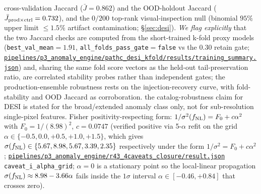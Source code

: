 \documentclass[aps,prd,twocolumn,superscriptaddress,showpacs,preprintnumbers,nofootinbib,longbibliography,floatfix]{revtex4-2}
\newcommand{\repoBase}{https://github.com/Hubify-Projects/bigbounce/blob/main}
\newcommand{\artifact}[1]{\href{\repoBase/#1}{\nolinkurl{#1}}}
\newcommand{\sigfnl}{\sigma(f_{\rm NL})}
\begin{document}
cross-validation Jaccard ($\bar J = 0.862$) and the OOD-holdout Jaccard ($\bar J_{\rm prod\times ctrl} = 0.732$), and the $0/200$ top-rank visual-inspection null (binomial $95\%$ upper limit $\leq 1.5\%$ artifact contamination; \S\ref{sec:desi}). \emph{We flag explicitly} that the two Jaccard checks are computed from the short-trained k-fold proxy models (\texttt{best\_val\_mean}$=1.91$, \texttt{all\_folds\_pass\_gate}$=$\texttt{false} vs the $0.30$ retain gate; \artifact{pipelines/p3\_anomaly\_engine/pathc\_desi\_kfold/results/training\_summary.json}) and, sharing the same fold score vectors as the held-out tail-preservation ratio, are correlated stability probes rather than independent gates; the production-ensemble robustness rests on the injection-recovery curve, with fold-stability and OOD Jaccard as corroboration. the catalog-robustness claim for DESI is stated for the broad/extended anomaly class only, not for sub-resolution single-pixel features. Fisher positivity-respecting form: $1/\sigma^2(f_{\rm NL}) = F_0 + c\alpha^2$ with $F_0 = 1/(8.98)^2$, $c = 0.0747$ (verified positive via 5-$\alpha$ refit on the grid $\alpha \in \{-0.5, 0.0, +0.5, +1.0, +1.5\}$, which gives $\sigma(f_{\rm NL}) \in \{5.67, 8.98, 5.67, 3.39, 2.35\}$ respectively under the form $1/\sigma^2 = F_0 + c\alpha^2$; \artifact{pipelines/p3\_anomaly\_engine/r43\_4caveats\_closure/result.json} \texttt{caveat\_i\_alpha\_grid}; $\alpha = 0$ is a stationary point so the local-linear propagation $\sigfnl \approx 8.98 - 3.66\alpha$ fails inside the $1\sigma$ interval $\alpha \in [-0.46, +0.84]$ that crosses zero).
\end{document}

